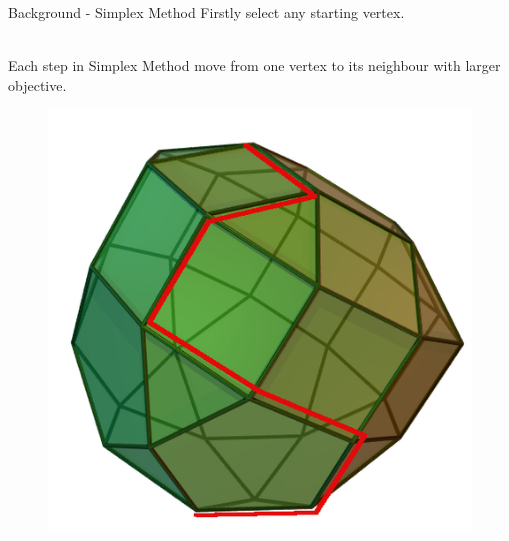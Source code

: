 \documentclass{beamer}
\begin{document}

\begin{frame}{Background - Simplex Method}
	Firstly select any starting vertex. \\~\

	Each step in Simplex Method move from one vertex to its neighbour with larger objective.

	\begin{figure}[r]
		\includegraphics[width=0.4\linewidth]{pics/simplex_method.png}
	\end{figure}


\end{frame}
\end{document}
